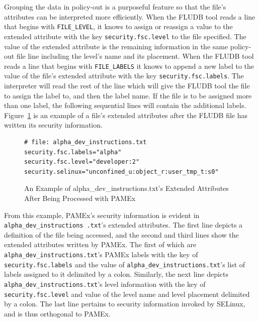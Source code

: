 Grouping the data in policy-out is a purposeful feature so that the 
file’s attributes can be interpreted more efficiently. When the FLUDB tool reads 
a line that begins with \texttt{FILE\_LEVEL}, it knows to assign or reassign 
a value to the extended attribute with the key \texttt{security.fsc.level} to the 
file specified. The value of the extended attribute is the remaining
information in the same policy-out file line including the 
level’s name and its placement. When the FLUDB tool reads a line that 
begins with \texttt{FILE\_LABELS} it knows to append a new label to the value of 
the file’s extended attribute with the key \texttt{security.fsc.labels}. The 
interpreter will read the rest of the line which will give the FLUDB 
tool the file to assign the label to, and then the label name. If the 
file is to be assigned more than one label, the following sequential 
lines will contain the additional labels. Figure~\ref{xattrex} is 
an example of a file’s extended attributes after the FLUDB file has 
written its security information.

\begin{figure}[htb]
    \centering
    \begin{tcolorbox}[width=.8\textwidth, boxsep=5pt, sharp corners, colback=white, colframe=black, fontupper=\footnotesize\ttfamily] %
        \begin{minipage}{\textwidth} %
            \begin{lstlisting}
# file: alpha_dev_instructions.txt
security.fsc.labels="alpha"
security.fsc.level="developer:2"
security.selinux="unconfined_u:object_r:user_tmp_t:s0"
            \end{lstlisting}
        \end{minipage}
    \end{tcolorbox}
    \caption[Example of Extended Attributes Written by PAMEx]{\label{xattrex}An Example of alpha\_dev\_instructions.txt's Extended Attributes After Being Processed with PAMEx}
\end{figure}

From this example, PAMEx's security information is evident in \texttt{alpha}\texttt{\_dev}\texttt{\_instructions .txt}'s
extended attributes. The first line depicts a definition of the file being
accessed, and the second and third lines show the extended attributes written
by PAMEx. The first of which are \texttt{alpha}\texttt{\_dev}\texttt{\_instructions.txt}'s PAMEx labels with the key of
\texttt{security.fsc.labels} and the value of \texttt{alpha}\texttt{\_dev}\texttt{\_instructions.txt}'s list of labels assigned to
it delimited by a colon. Similarly, the next line depicts \texttt{alpha}\texttt{\_dev}\texttt{\_instructions.txt}'s level
information with the key of \texttt{security.fsc.level} and value of the level name
and level placement delimited by a colon. The last line pertains to security
information invoked by SELinux, and is thus orthogonal to PAMEx.

